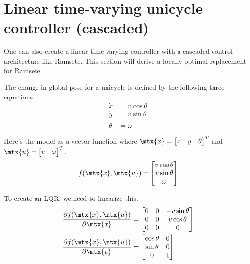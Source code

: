 \section{Linear time-varying unicycle controller (cascaded)}

One can also create a linear time-varying controller with a cascaded control
architecture like Ramsete. This section will derive a locally optimal
replacement for Ramsete.

The change in global pose for a unicycle is defined by the following three
equations.
\begin{align*}
  \dot{x} &= v\cos\theta \\
  \dot{y} &= v\sin\theta \\
  \dot{\theta} &= \omega
\end{align*}

Here's the model as a vector function where
$\mtx{x} = \begin{bmatrix} x & y & \theta \end{bmatrix}^T$ and
$\mtx{u} = \begin{bmatrix} v & \omega \end{bmatrix}^T$.
\begin{equation}
  f(\mtx{x}, \mtx{u}) =
  \begin{bmatrix}
    v\cos\theta \\
    v\sin\theta \\
    \omega
  \end{bmatrix}
\end{equation}

To create an LQR, we need to linearize this.
\begin{align*}
  \frac{\partial f(\mtx{x}, \mtx{u})}{\partial\mtx{x}} &=
  \begin{bmatrix}
    0 & 0 & -v\sin\theta \\
    0 & 0 & v\cos\theta \\
    0 & 0 & 0
  \end{bmatrix} \\
  \frac{\partial f(\mtx{x}, \mtx{u})}{\partial\mtx{u}} &=
  \begin{bmatrix}
    \cos\theta & 0 \\
    \sin\theta & 0 \\
    0 & 1
  \end{bmatrix}
\end{align*}

